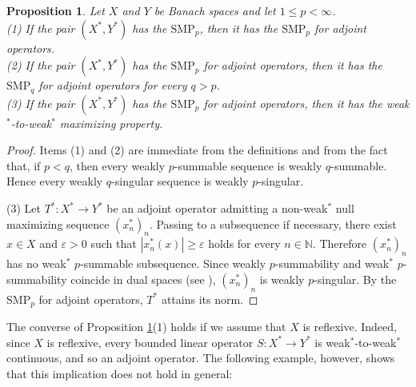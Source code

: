 \documentclass[12 pt]{article}%
\newtheorem{proposition}[theorem]{Proposition}
\newtheorem{final remark}[theorem]{Final Remark}
\newtheorem{definition}[theorem]{Definition}
\newcommand {\N} {\mathbb{N}}
\begin{document}

\begin{proposition}\label{adj2}
Let $X$ and $Y$ be Banach spaces and let $1\leq p<\infty$. \\
{\rm (1)} If the pair $(X^*,Y^*)$ has the $\mathrm{SMP}_p$, then it has the $\mathrm{SMP}_p$ for adjoint operators. \\
{\rm (2)} If the pair $(X^*,Y^*)$ has the $\mathrm{SMP}_p$ for adjoint operators, then it has the $\mathrm{SMP}_q$ for adjoint operators for every $q>p$.\\
{\rm (3)} If the pair $(X^*,Y^*)$ has the $\mathrm{SMP}_p$ for adjoint operators, then it has the weak$^*$-to-weak$^*$ maximizing property. 
\end{proposition}


\begin{proof}
Items (1) and (2) are immediate from the definitions and from the fact that, if $p<q$, then every weakly $p$-summable sequence is weakly $q$-summable. Hence every weakly $q$-singular sequence is weakly $p$-singular.

(3) Let $T^*:X^*\to Y^*$ be an adjoint operator admitting a non-weak$^*$ null maximizing sequence $(x_n^*)_n$. Passing to a subsequence if necessary, there exist $x\in X$ and $\varepsilon>0$ such that $|x_n^*(x)|\geq \varepsilon$ holds
for every $n\in\N$. Therefore $(x_n^*)_n$ has no weak$^*$ $p$-summable subsequence. Since weakly $p$-summability and weak$^*$ $p$-summability coincide in dual spaces (see \cite[p. 2]{fourie}), $(x_n^*)_n$ is weakly $p$-singular. By the $\mathrm{SMP}_p$ for adjoint operators, $T^*$ attains its norm.
\end{proof}




The converse of Proposition \ref{adj2}(1) holds if we assume that $X$ is reflexive. Indeed, since $X$ is reflexive, every bounded linear operator 
$S: X^* \to Y^*$ is weak$^*$-to-weak$^*$ continuous, and so an adjoint operator. The following example, however, shows that this implication does not hold in general: 
\end{document}
